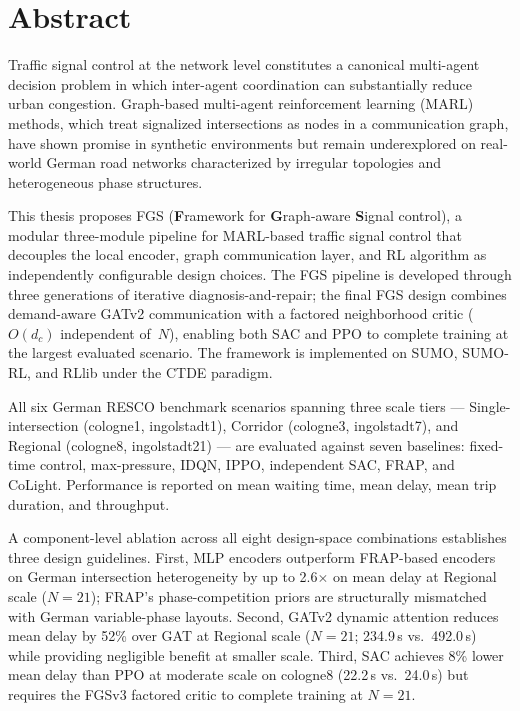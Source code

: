 \chapter*{Abstract}
\label{ch:Abstract}

Traffic signal control at the network level constitutes a canonical multi-agent decision problem in which inter-agent coordination can substantially reduce urban congestion. Graph-based multi-agent reinforcement learning (MARL) methods, which treat signalized intersections as nodes in a communication graph, have shown promise in synthetic environments but remain underexplored on real-world German road networks characterized by irregular topologies and heterogeneous phase structures.

This thesis proposes FGS (\textbf{F}ramework for \textbf{G}raph-aware \textbf{S}ignal control), a modular three-module pipeline for MARL-based traffic signal control that decouples the local encoder, graph communication layer, and RL algorithm as independently configurable design choices. The FGS pipeline is developed through three generations of iterative diagnosis-and-repair; the final FGS design combines demand-aware GATv2 communication with a factored neighborhood critic ($O(d_c)$ independent of~$N$), enabling both SAC and PPO to complete training at the largest evaluated scenario. The framework is implemented on SUMO, SUMO-RL, and RLlib under the CTDE paradigm.

All six German RESCO benchmark scenarios spanning three scale tiers — Single-intersection (cologne1, ingolstadt1), Corridor (cologne3, ingolstadt7), and Regional (cologne8, ingolstadt21) — are evaluated against seven baselines: fixed-time control, max-pressure, IDQN, IPPO, independent SAC, FRAP, and CoLight. Performance is reported on mean waiting time, mean delay, mean trip duration, and throughput.

A component-level ablation across all eight design-space combinations establishes three design guidelines. First, MLP encoders outperform FRAP-based encoders on German intersection heterogeneity by up to 2.6$\times$ on mean delay at Regional scale ($N=21$); FRAP's phase-competition priors are structurally mismatched with German variable-phase layouts. Second, GATv2 dynamic attention reduces mean delay by 52\% over GAT at Regional scale ($N=21$; 234.9\,s vs.\ 492.0\,s) while providing negligible benefit at smaller scale. Third, SAC achieves 8\% lower mean delay than PPO at moderate scale on cologne8 (22.2\,s vs.\ 24.0\,s) but requires the FGSv3 factored critic to complete training at $N=21$.

